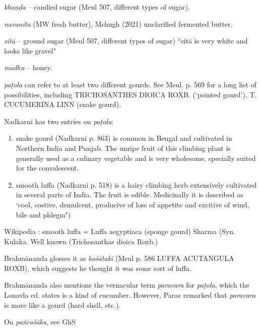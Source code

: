 \begin{ekdosis}
\begin{testimonia}[hp01_062]
\end{testimonia}

\begin{philcomm}[hp01_062]
\emph{khaṇḍa} -- candied sugar (Meul 507, different types of sugar).

\emph{navanīta} (MW fresh butter), Mchugh (2021) unclarified fermented butter.

\emph{sitā} -- ground sugar (Meul 507, different types of sugar) ``sitā is very white and looks like gravel"

\emph{madhu} -- honey.

\emph{paṭola} can refer to at least two different gourds. See Meul. p. 569 for a long list of possibilities, including TRICHOSANTHES DIOICA ROXB. (`pointed gourd'), T. CUCUMERINA LINN (snake gourd).

Nadkarni has two entries on \emph{paṭola}:
\begin{enumerate}
\item snake gourd (Nadkarni p. 863) is common in Bengal and cultivated in Northern India and Punjab. The unripe fruit of this climbing plant is generally used as a culinary vegetable and is very wholesome, specially suited for the convalescent.

\item smooth luffa (Nadkarni p. 518) is a hairy climbing herb extensively cultivated in several parts of India. The fruit is edible. Medicinally it is described as `cool, costive, demulcent, producive of loss of appetite and excitive of wind, bile and phlegm")
\end{enumerate}

Wikipedia : smooth luffa = Luffa aegyptiaca (sponge gourd)
Sharma (Syn. Kulaka. Well known (Trichosanthas dioica Roxb.)

Brahmānanda glosses it as \emph{kośātakī} (Meul p. 586 LUFFA ACUTANGULA ROXB), which suggests he thought it was some sort of luffa.

Brahmānanda also mentions the vernacular term \emph{paravara} for \emph{paṭola}, which the Lonavla ed. states is a kind of cucumber. However, Paras remarked that \emph{paravara} is more like a gourd (hard shell, etc.).

On \emph{pañcaśāka}, see GhS

\begin{versinnote}
\end{versinnote}


\end{philcomm}
\end{ekdosis}
